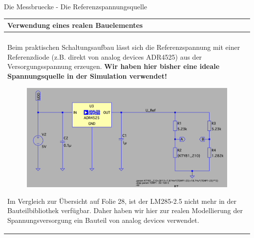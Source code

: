 \begin{frame}[t]{Die Messbruecke - Die Referenzspannungsquelle} 
    
    \begin{spacing}{0.9} \begin{tiny}
      \begin{table}[h!]
      \begin{tabular}{p{10cm} }
        \hline
        \textbf{Verwendung eines realen Bauelementes} \\
        \hline \\
        \begin{minipage}{\textwidth}  
            Beim praktischen Schaltungsaufbau lässt sich die Referenzspannung mit einer Referenzdiode (z.B. direkt von analog devices ADR4525) 
            aus der Versorgungsspannung erzeugen. \textbf{Wir haben hier bisher eine ideale Spannungsquelle in der Simulation verwendet!}\newline
            \begin{figure}
                \includegraphics[width=0.8\linewidth]{pictures/uref.png}
            \end{figure}
            Im Vergleich zur Übersicht auf Folie 28, ist der LM285-2.5 nicht mehr in der Bauteilbibliothek verfügbar. 
            Daher haben wir hier zur realen Modellierung der Spannungsversorgung ein Bauteil von analog devices verwendet.
        \end{minipage} 
    \end{tabular}

    \end{table}
     
    \end{tiny} \end{spacing}

\end{frame}


